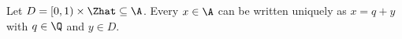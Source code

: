 Let $D=[0,1)\times\Zhat\subseteq\A$. Every $x\in\A$ can be written uniquely as $x=q+y$ with $q\in\Q$ and $y\in D$.
